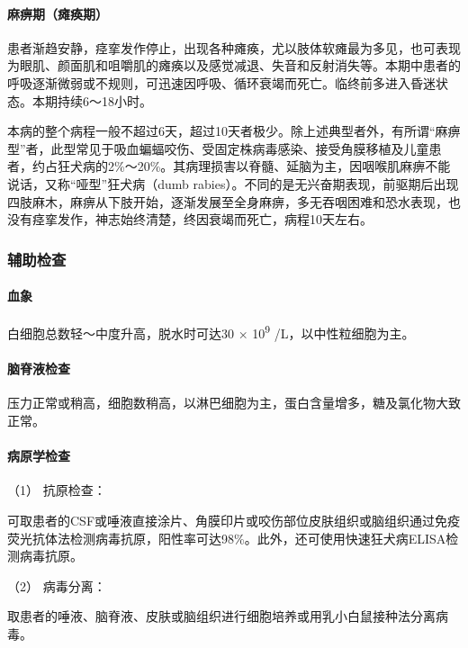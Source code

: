 \paragraph{麻痹期（瘫痪期）}

患者渐趋安静，痉挛发作停止，出现各种瘫痪，尤以肢体软瘫最为多见，也可表现为眼肌、颜面肌和咀嚼肌的瘫痪以及感觉减退、失音和反射消失等。本期中患者的呼吸逐渐微弱或不规则，可迅速因呼吸、循环衰竭而死亡。临终前多进入昏迷状态。本期持续6～18小时。

本病的整个病程一般不超过6天，超过10天者极少。除上述典型者外，有所谓“麻痹型”者，此型常见于吸血蝙蝠咬伤、受固定株病毒感染、接受角膜移植及儿童患者，约占狂犬病的2\%～20\%。其病理损害以脊髓、延脑为主，因咽喉肌麻痹不能说话，又称“哑型”狂犬病（dumb
rabies）。不同的是无兴奋期表现，前驱期后出现四肢麻木，麻痹从下肢开始，逐渐发展至全身麻痹，多无吞咽困难和恐水表现，也没有痉挛发作，神志始终清楚，终因衰竭而死亡，病程10天左右。

\subsubsection{辅助检查}

\paragraph{血象}

白细胞总数轻～中度升高，脱水时可达30 × 10\textsuperscript{9}
/L，以中性粒细胞为主。

\paragraph{脑脊液检查}

压力正常或稍高，细胞数稍高，以淋巴细胞为主，蛋白含量增多，糖及氯化物大致正常。

\paragraph{病原学检查}

\hypertarget{text00221.htmlux5cux23CHP7-6-2-3-3-1}{}
（1） 抗原检查：

可取患者的CSF或唾液直接涂片、角膜印片或咬伤部位皮肤组织或脑组织通过免疫荧光抗体法检测病毒抗原，阳性率可达98\%。此外，还可使用快速狂犬病ELISA检测病毒抗原。

\hypertarget{text00221.htmlux5cux23CHP7-6-2-3-3-2}{}
（2） 病毒分离：

取患者的唾液、脑脊液、皮肤或脑组织进行细胞培养或用乳小白鼠接种法分离病毒。

